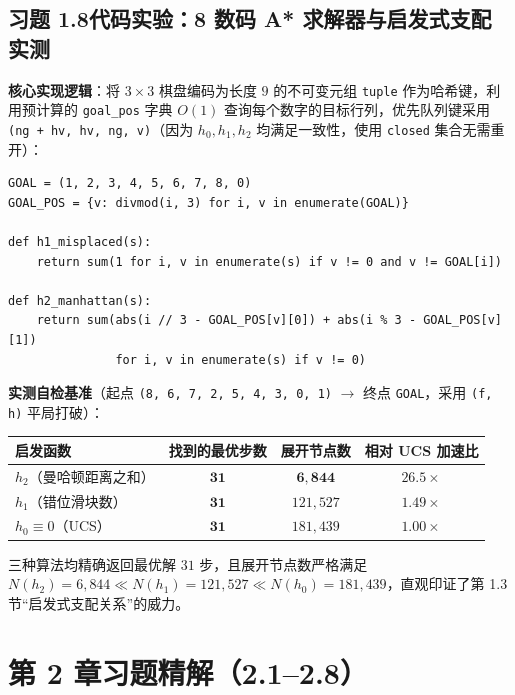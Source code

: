 \subsection*{习题 1.8\quad 代码实验：8 数码 A* 求解器与启发式支配实测}
\textbf{核心实现逻辑}：将 $3\times 3$ 棋盘编码为长度 $9$ 的不可变元组 \texttt{tuple} 作为哈希键，利用预计算的 \texttt{goal\_pos} 字典 $O(1)$ 查询每个数字的目标行列，优先队列键采用 \texttt{(ng + hv, hv, ng, v)}（因为 $h_0, h_1, h_2$ 均满足一致性，使用 \texttt{closed} 集合无需重开）：
\begin{lstlisting}
GOAL = (1, 2, 3, 4, 5, 6, 7, 8, 0)
GOAL_POS = {v: divmod(i, 3) for i, v in enumerate(GOAL)}

def h1_misplaced(s):
    return sum(1 for i, v in enumerate(s) if v != 0 and v != GOAL[i])

def h2_manhattan(s):
    return sum(abs(i // 3 - GOAL_POS[v][0]) + abs(i % 3 - GOAL_POS[v][1])
               for i, v in enumerate(s) if v != 0)
\end{lstlisting}
\textbf{实测自检基准}（起点 \texttt{(8, 6, 7, 2, 5, 4, 3, 0, 1)} $\to$ 终点 \texttt{GOAL}，采用 \texttt{(f, h)} 平局打破）：
\begin{center}
\small
\begin{tabular}{@{}lccc@{}}
\toprule
\textbf{启发函数} & \textbf{找到的最优步数} & \textbf{展开节点数} & \textbf{相对 UCS 加速比} \\
\midrule
$h_2$（曼哈顿距离之和） & $\mathbf{31}$ & $\mathbf{6{,}844}$ & $\mathbf{26.5\times}$ \\
$h_1$（错位滑块数） & $\mathbf{31}$ & $121{,}527$ & $1.49\times$ \\
$h_0 \equiv 0$（UCS） & $\mathbf{31}$ & $181{,}439$ & $1.00\times$ \\
\bottomrule
\end{tabular}
\end{center}
三种算法均精确返回最优解 $31$ 步，且展开节点数严格满足 $N(h_2) = 6{,}844 \ll N(h_1) = 121{,}527 \ll N(h_0) = 181{,}439$，直观印证了第 1.3 节“启发式支配关系”的威力。

\section{第 2 章习题精解（2.1--2.8）}


